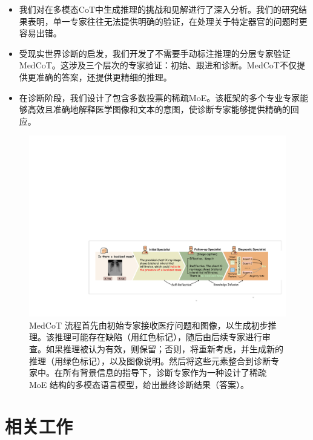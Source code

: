 \documentclass[11pt]{article}
\begin{document}
\begin{itemize}
    \item 我们对在多模态CoT中生成推理的挑战和见解进行了深入分析。我们的研究结果表明，单一专家往往无法提供明确的验证，在处理关于特定器官的问题时更容易出错。
    \item 受现实世界诊断的启发，我们开发了不需要手动标注推理的分层专家验证MedCoT。这涉及三个层次的专家验证：初始、跟进和诊断。MedCoT不仅提供更准确的答案，还提供更精细的推理。
    \item 在诊断阶段，我们设计了包含多数投票的稀疏MoE。该框架的多个专业专家能够高效且准确地解释医学图像和文本的意图，使诊断专家能够提供精确的回应。

\end{itemize}

\vspace{1em}

\begin{figure}
\centering
\includegraphics[width=\textwidth]{image/Figure_pipeline_v7.pdf}
\caption{ MedCoT 流程首先由初始专家接收医疗问题和图像，以生成初步推理。该推理可能存在缺陷（用红色标记），随后由后续专家进行审查。如果推理被认为有效，则保留；否则，将重新考虑，并生成新的推理（用绿色标记），以及图像说明。然后将这些元素整合到诊断专家中。在所有背景信息的指导下，诊断专家作为一种设计了稀疏 MoE 结构的多模态语言模型，给出最终诊断结果（答案）。 }
\label{MedCoT pipeline}
\vspace{-1em}
\end{figure}
\section{相关工作}
\vspace{-0.5em}
\end{document}
